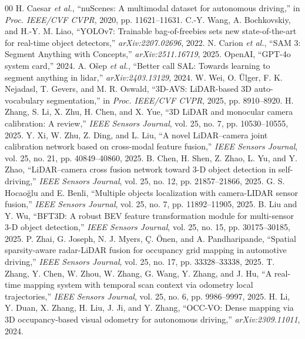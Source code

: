 \documentclass{IEEE_lsens/IEEE_lsens}
\begin{document}
\sloppy
\setlength{\emergencystretch}{1em}
\begin{thebibliography}{00}
H. Caesar \emph{et al.}, ``nuScenes: A multimodal dataset for autonomous driving,'' in \emph{Proc. IEEE/CVF CVPR}, 2020, pp. 11621--11631.
C.-Y. Wang, A. Bochkovskiy, and H.-Y. M. Liao, ``YOLOv7: Trainable bag-of-freebies sets new state-of-the-art for real-time object detectors,'' \emph{arXiv:2207.02696}, 2022.
N. Carion \emph{et al.}, ``SAM 3: Segment Anything with Concepts,'' \emph{arXiv:2511.16719}, 2025.
OpenAI, ``GPT-4o system card,'' 2024.
A. O\v{s}ep \emph{et al.}, ``Better call SAL: Towards learning to segment anything in lidar,'' \emph{arXiv:2403.13129}, 2024.
W. Wei, O. \"Ulger, F. K. Nejadasl, T. Gevers, and M. R. Oswald, ``3D-AVS: LiDAR-based 3D auto-vocabulary segmentation,'' in \emph{Proc. IEEE/CVF CVPR}, 2025, pp. 8910--8920.
H. Zhang, S. Li, X. Zhu, H. Chen, and X. Yue, ``3D LiDAR and monocular camera calibration: A review,'' \emph{IEEE Sensors Journal}, vol. 25, no. 7, pp. 10530--10555, 2025.
Y. Xi, W. Zhu, Z. Ding, and L. Liu, ``A novel LiDAR--camera joint calibration network based on cross-modal feature fusion,'' \emph{IEEE Sensors Journal}, vol. 25, no. 21, pp. 40849--40860, 2025.
B. Chen, H. Shen, Z. Zhao, L. Yu, and Y. Zhao, ``LiDAR--camera cross fusion network toward 3-D object detection in self-driving,'' \emph{IEEE Sensors Journal}, vol. 25, no. 12, pp. 21857--21866, 2025.
G. S. Hocao\u{g}lu and E. Benli, ``Multiple objects localization with camera-LIDAR sensor fusion,'' \emph{IEEE Sensors Journal}, vol. 25, no. 7, pp. 11892--11905, 2025.
B. Liu and Y. Wu, ``BFT3D: A robust BEV feature transformation module for multi-sensor 3-D object detection,'' \emph{IEEE Sensors Journal}, vol. 25, no. 15, pp. 30175--30185, 2025.
P. Zhai, G. Joseph, N. J. Myers, \c{C}. \"Onen, and A. Pandharipande, ``Spatial sparsity-aware radar-LiDAR fusion for occupancy grid mapping in automotive driving,'' \emph{IEEE Sensors Journal}, vol. 25, no. 17, pp. 33328--33338, 2025.
T. Zhang, Y. Chen, W. Zhou, W. Zhang, G. Wang, Y. Zhang, and J. Hu, ``A real-time mapping system with temporal scan context via odometry local trajectories,'' \emph{IEEE Sensors Journal}, vol. 25, no. 6, pp. 9986--9997, 2025.
H. Li, Y. Duan, X. Zhang, H. Liu, J. Ji, and Y. Zhang, ``OCC-VO: Dense mapping via 3D occupancy-based visual odometry for autonomous driving,'' \emph{arXiv:2309.11011}, 2024.

\end{thebibliography}
\end{document}
